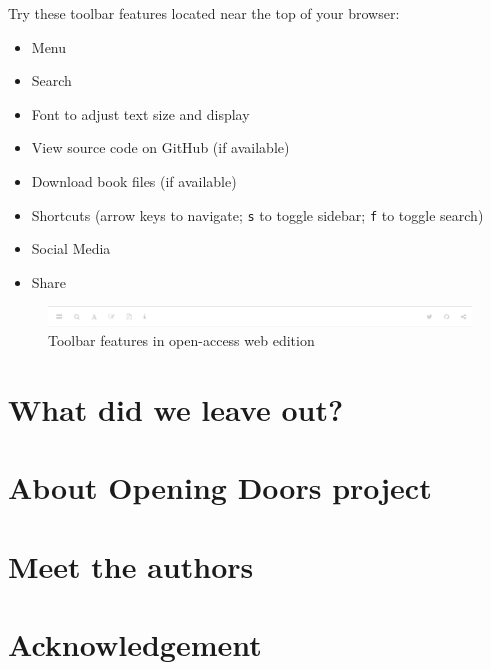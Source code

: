 \documentclass[
]{book}
\providecommand{\tightlist}{%
  \setlength{\itemsep}{0pt}\setlength{\parskip}{0pt}}
\begin{document}
Try these toolbar features located near the top of your browser:

\begin{itemize}
\tightlist
\item
  Menu
\item
  Search
\item
  Font to adjust text size and display
\item
  View source code on GitHub (if available)
\item
  Download book files (if available)
\item
  Shortcuts (arrow keys to navigate; \texttt{s} to toggle sidebar; \texttt{f} to toggle search)
\item
  Social Media
\item
  Share
\end{itemize}

\begin{figure}
\centering
\includegraphics{images/toolbarimage.png}
\caption{Toolbar features in open-access web edition}
\end{figure}

\hypertarget{what-did-we-leave-out}{%
\section*{What did we leave out?}\label{what-did-we-leave-out}}

\hypertarget{about-opening-doors-project}{%
\section*{About Opening Doors project}\label{about-opening-doors-project}}

\hypertarget{meet-the-authors}{%
\section*{Meet the authors}\label{meet-the-authors}}

\hypertarget{acknowledgement}{%
\section*{Acknowledgement}\label{acknowledgement}}
\end{document}
